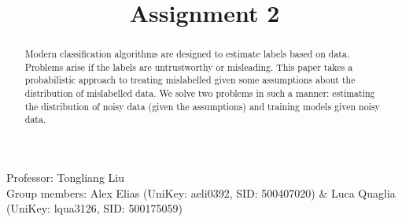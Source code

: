 \documentclass{article} %
\title{Assignment 2}
\begin{document}
\maketitle

Professor: Tongliang Liu\\
Group members: Alex Elias (UniKey: aeli0392, SID: 500407020) \& Luca Quaglia (UniKey: lqua3126, SID: 500175059)\\
\begin{abstract}

Modern classification algorithms are designed to estimate labels based on data.
Problems arise if the labels are untrustworthy or misleading.
This paper takes a probabilistic approach to treating mislabelled given some assumptions about the distribution of mislabelled data.
We solve two problems in such a manner: estimating the distribution of noisy data (given the assumptions) and training models given noisy data.
\end{abstract}
\end{document}
